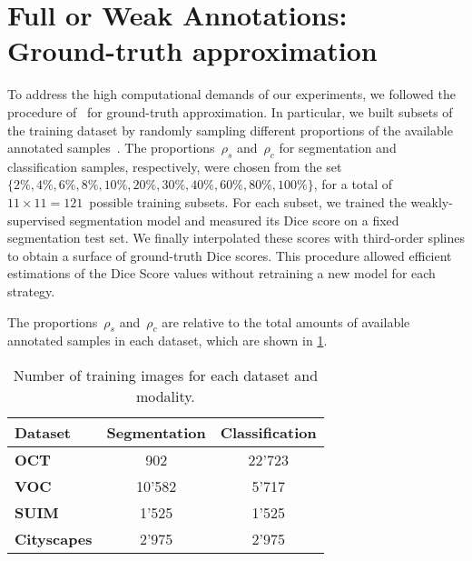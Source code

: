\section{Full or Weak Annotations: Ground-truth approximation}
\label{sec:gt}
To address the high computational demands of our experiments, we followed the procedure of~\cite{mahmood2022optimizing} for ground-truth approximation. 
In particular, we built subsets of the training dataset by randomly sampling different proportions of the available annotated samples~\cite{mahmood2022}. The proportions~$\rho_s$ and~$\rho_c$ for segmentation and classification samples, respectively, were chosen from the set~$\{2\%, 4\%,	6\%, 8\%, 10\%, 20\%, 30\%, 40\%, 60\%, 80\%, 100\%\}$, for a total of $11\times{}11=121$~possible training subsets. For each subset, we trained the weakly-supervised segmentation model and measured its Dice score on a fixed segmentation test set. We finally interpolated these scores with third-order splines to obtain a surface of ground-truth Dice scores. This procedure allowed efficient estimations of the Dice Score values without retraining a new model for each strategy.

The proportions~$\rho_s$ and~$\rho_c$ are relative to the total amounts of available annotated samples in each dataset, which are shown in \cref{tab:datasets}.



\begin{table}[h]
\centering
\begin{tabular}{lcc}
\hline
\textbf{Dataset} & \textbf{Segmentation} & \textbf{Classification} \\ \hline
\textbf{OCT} & 902 & 22'723 \\
\textbf{VOC} & 10'582 & 5'717 \\
\textbf{SUIM} & 1'525 & 1'525 \\
\textbf{Cityscapes} & 2'975 & 2'975 \\ \hline
\end{tabular}
\caption{Number of training images for each dataset and modality.}
\label{tab:datasets}
\end{table}
